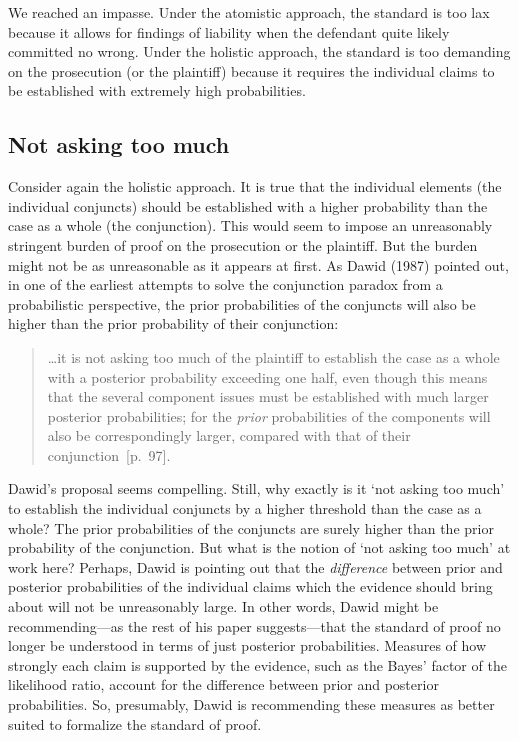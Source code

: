 \documentclass[
  10pt,
  dvipsnames,enabledeprecatedfontcommands]{scrartcl}
\begin{document}
We reached an impasse. Under the atomistic approach, the standard is too
lax because it allows for findings of liability when the defendant quite
likely committed no wrong. Under the holistic approach, the standard is
too demanding on the prosecution (or the plaintiff) because it requires
the individual claims to be established with extremely high
probabilities.

\hypertarget{not-asking-too-much}{%
\subsection{Not asking too much}\label{not-asking-too-much}}

Consider again the holistic approach. It is true that the individual
elements (the individual conjuncts) should be established with a higher
probability than the case as a whole (the conjunction). This would seem
to impose an unreasonably stringent burden of proof on the prosecution
or the plaintiff. But the burden might not be as unreasonable as it
appears at first. As Dawid (1987) pointed out, in one of the earliest
attempts to solve the conjunction paradox from a probabilistic
perspective, the prior probabilities of the conjuncts will also be
higher than the prior probability of their conjunction:

\begin{quote}
\dots it is not asking too much of the plaintiff to establish the case as a whole with a posterior probability exceeding one half, even though this means  that the several component issues must be established with much larger posterior probabilities; for the \textit{prior}  probabilities of the components will also be correspondingly larger, compared with that of their conjunction~[p.~97].
 \end{quote}

Dawid's proposal seems compelling. Still, why exactly is it `not asking
too much' to establish the individual conjuncts by a higher threshold
than the case as a whole? The prior probabilities of the conjuncts are
surely higher than the prior probability of the conjunction. But what is
the notion of `not asking too much' at work here? Perhaps, Dawid is
pointing out that the \textit{difference} between prior and posterior
probabilities of the individual claims which the evidence should bring
about will not be unreasonably large. In other words, Dawid might be
recommending---as the rest of his paper suggests---that the standard of
proof no longer be understood in terms of just posterior probabilities.
Measures of how strongly each claim is supported by the evidence, such
as the Bayes' factor of the likelihood ratio, account for the difference
between prior and posterior probabilities. So, presumably, Dawid is
recommending these measures as better suited to formalize the standard
of proof.
\end{document}
